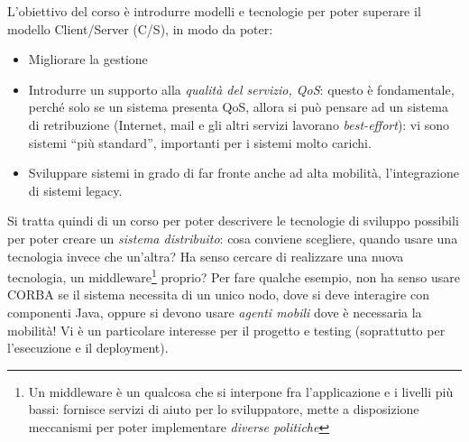 L'obiettivo del corso è introdurre modelli e tecnologie per poter superare il modello Client/Server (C/S), in modo 
da poter:
\begin{itemize}
 \item Migliorare la gestione
 \item Introdurre un supporto alla \textit{qualità del servizio, QoS}: questo è fondamentale, perché solo se un sistema
 presenta QoS, allora si può pensare ad un sistema di retribuzione (Internet, mail e gli altri servizi
lavorano \textit{best-effort}): vi sono sistemi ``più standard'', importanti per i sistemi molto carichi.
\item Sviluppare sistemi in grado di far fronte anche ad alta mobilità, l'integrazione di sistemi legacy.
\end{itemize}
Si tratta quindi di un corso per poter descrivere le tecnologie di sviluppo possibili per poter creare un
\textit{sistema distribuito}: cosa conviene scegliere, quando usare una tecnologia invece che un'altra? Ha senso cercare
di realizzare una nuova tecnologia, un middleware\footnote{Un middleware è un qualcosa che si interpone fra
l'applicazione e i livelli più bassi: fornisce servizi di aiuto per lo sviluppatore, mette a disposizione meccanismi per
poter implementare \textit{diverse politiche}} proprio? Per fare qualche esempio, non ha senso usare CORBA se il sistema
necessita di un unico nodo, dove si deve interagire con componenti Java, oppure si devono usare \textit{agenti mobili}
dove è necessaria la mobilità! Vi è un particolare interesse per il progetto e testing (soprattutto per l'esecuzione e
il deployment).